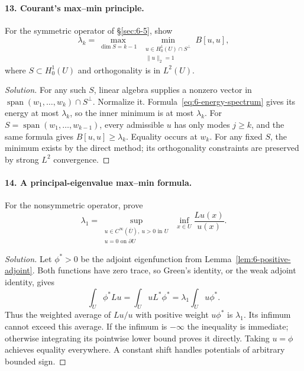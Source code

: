 \paragraph{13. Courant's max--min principle.}
For the symmetric operator of \S\ref{sec:6-5}, show
\[
 \lambda_k=\max_{\dim S=k-1}\ \min_{\substack{u\in H^1_0(U)\cap S^\perp\\\|u\|_2=1}} B[u,u],
\]
where $S\subset H^1_0(U)$ and orthogonality is in $L^2(U)$.
\begin{proof}[Solution]
For any such $S$, linear algebra supplies a nonzero vector in
$\operatorname{span}(w_1,\ldots,w_k)\cap S^\perp$.
Normalize it. Formula~\eqref{eq:6-energy-spectrum} gives its energy
at most $\lambda_k$, so the inner minimum is at most $\lambda_k$.
For $S=\operatorname{span}(w_1,\ldots,w_{k-1})$, every admissible $u$
has only modes $j\geq k$, and the same formula gives
$B[u,u]\geq\lambda_k$. Equality occurs at $w_k$.
For any fixed $S$, the minimum exists by the direct method; its
orthogonality constraints are preserved by strong $L^2$ convergence.
\end{proof}
\Needspace{45mm}

\Needspace{30mm}

\Needspace{45mm}
\paragraph{14. A principal-eigenvalue max--min formula.}
For the nonsymmetric operator, prove
\[
 \lambda_1=\sup_{\substack{u\in C^\infty(\overline U),\
                  u>0\text{ in }U\\u=0\text{ on }\partial U}}
                  \ \inf_{x\in U}\frac{Lu(x)}{u(x)}.
\]
\begin{proof}[Solution]
Let $\phi^*>0$ be the adjoint eigenfunction from
Lemma~\ref{lem:6-positive-adjoint}. Both functions have zero trace,
so Green's identity, or the weak adjoint identity, gives
\[
 \int_U\phi^*Lu=\int_UuL^*\phi^*
                =\lambda_1\int_Uu\phi^*.
\]
Thus the weighted average of $Lu/u$ with positive weight $u\phi^*$
is $\lambda_1$. Its infimum cannot exceed this average.
If the infimum is $-\infty$ the inequality is immediate; otherwise
integrating its pointwise lower bound proves it directly.
Taking $u=\phi$ achieves equality everywhere.
A constant shift handles potentials of arbitrary bounded sign.
\end{proof}

